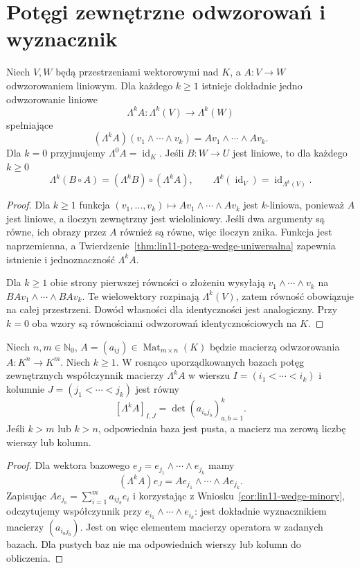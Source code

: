 \section{Potęgi zewnętrzne odwzorowań i wyznacznik}
\label{sec:lin11-operator-wedge}

\begin{twierdzenie}
\label{thm:lin11-potega-operatora}
Niech \(V,W\) będą przestrzeniami
wektorowymi nad \(K\), a
\(A\colon V\to W\) odwzorowaniem liniowym.
Dla każdego \(k\ge1\) istnieje dokładnie
jedno odwzorowanie liniowe
\[
 \Lambda^k A\colon\Lambda^k(V)\to\Lambda^k(W)
\]
spełniające
\[
 (\Lambda^k A)(v_1\wedge\cdots\wedge v_k)
 =Av_1\wedge\cdots\wedge Av_k.
\]
Dla \(k=0\) przyjmujemy
\(\Lambda^0 A=\operatorname{id}_K\).
Jeśli \(B\colon W\to U\) jest liniowe,
to dla każdego \(k\ge0\)
\[
 \Lambda^k(B\circ A)
 =(\Lambda^k B)\circ(\Lambda^k A),
 \qquad
 \Lambda^k(\operatorname{id}_V)
 =\operatorname{id}_{\Lambda^k(V)}.
\]
\end{twierdzenie}
\begin{proof}
Dla \(k\ge1\) funkcja
\((v_1,\ldots,v_k)\mapsto
 Av_1\wedge\cdots\wedge Av_k\)
jest \(k\)-liniowa, ponieważ
\(A\) jest liniowe, a iloczyn
zewnętrzny jest wieloliniowy.
Jeśli dwa argumenty są równe,
ich obrazy przez \(A\) również
są równe, więc iloczyn znika.
Funkcja jest naprzemienna,
a
Twierdzenie~\ref{thm:lin11-potega-wedge-uniwersalna}
zapewnia istnienie i
jednoznaczność \(\Lambda^k A\).

Dla \(k\ge1\) obie strony
pierwszej równości o złożeniu
wysyłają
\(v_1\wedge\cdots\wedge v_k\)
na \(BA v_1\wedge\cdots\wedge BA v_k\).
Te wielowektory rozpinają
\(\Lambda^k(V)\), zatem
równość obowiązuje na całej
przestrzeni. Dowód własności
dla identyczności jest analogiczny.
Przy \(k=0\) oba wzory są
równościami odwzorowań
identycznościowych na \(K\).
\end{proof}

\begin{twierdzenie}
\label{thm:lin11-minory}
Niech \(n,m\in\mathbb N_0\),
\(A=(a_{ij})\in\operatorname{Mat}_{m\times n}(K)\)
będzie macierzą odwzorowania
\(A\colon K^n\to K^m\).
Niech \(k\ge1\).
W rosnąco uporządkowanych bazach
potęg zewnętrznych współczynnik
macierzy \(\Lambda^k A\)
w wierszu
\(I=(i_1<\cdots<i_k)\)
i kolumnie
\(J=(j_1<\cdots<j_k)\)
jest równy
\[
 [\Lambda^k A]_{I,J}
 =\det(a_{i_a j_b})_{a,b=1}^{k}.
\]
Jeśli \(k>m\) lub \(k>n\),
odpowiednia baza jest pusta,
a macierz ma zerową liczbę
wierszy lub kolumn.
\end{twierdzenie}
\begin{proof}
Dla wektora bazowego
\(e_J=e_{j_1}\wedge\cdots\wedge e_{j_k}\)
mamy
\[
 (\Lambda^k A)e_J
 =Ae_{j_1}\wedge\cdots\wedge Ae_{j_k}.
\]
Zapisując
\(Ae_{j_b}=\sum_{i=1}^m a_{i j_b}e_i\)
i korzystając z
Wniosku~\ref{cor:lin11-wedge-minory},
odczytujemy współczynnik przy
\(e_{i_1}\wedge\cdots\wedge e_{i_k}\):
jest dokładnie wyznacznikiem
macierzy \((a_{i_a j_b})\).
Jest on więc elementem
macierzy operatora w zadanych
bazach. Dla pustych baz
nie ma odpowiednich
wierszy lub kolumn do obliczenia.
\end{proof}

